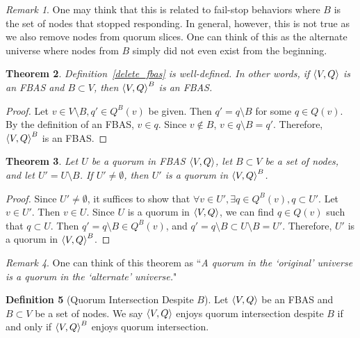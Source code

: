 \documentclass[12pt, psamsfonts]{amsart}
\newtheorem{thm}{Theorem}[subsection]
\theoremstyle{definition}
\newtheorem{defn}[thm]{Definition}
\theoremstyle{remark}
\newtheorem{rem}[thm]{Remark}
\numberwithin{equation}{subsection}
\begin{document}
\begin{rem}
    One may think that this is related to fail-stop behaviors where $B$ is the set of nodes that stopped responding.
    In general, however, this is not true as we also remove nodes from quorum slices.
    One can think of this as the alternate universe where nodes from $B$ simply did not even exist from the beginning.
\end{rem}

\begin{thm}
    Definition~\ref{delete_fbas} is well-defined.
    In other words, if $\ev{V, Q}$ is an FBAS and $B \subset V$, then $\ev{V, Q}^B$ is an FBAS\@.
\end{thm}

\begin{proof}
    Let $v \in V \setminus B, q' \in Q^B(v)$ be given.
    Then $q' = q \setminus B$ for some $q \in Q(v)$.
    By the definition of an FBAS, $v \in q$.
    Since $v \notin B$, $v \in q \setminus B = q'$.
    Therefore, $\ev{V, Q}^B$ is an FBAS\@.
\end{proof}

\begin{thm}\label{quorum_delete_fbas}
    Let $U$ be a quorum in FBAS $\ev{V, Q}$, let $B \subset V$ be a set of nodes, and let $U' = U \setminus B$.
    If $U' \ne \emptyset$, then $U'$ is a quorum in $\ev{V, Q}^B$.
\end{thm}

\begin{proof}
    Since $U' \ne \emptyset$, it suffices to show that $\forall v \in U', \exists q \in Q^B(v), q \subset U'$.
    Let $v \in U'$.
    Then $v \in U$.
    Since $U$ is a quorum in $\ev{V, Q}$, we can find $q \in Q(v)$ such that $q \subset U$.
    Then $q' = q \setminus B \in Q^B(v)$, and $q' = q \setminus B \subset U \setminus B = U'$.
    Therefore, $U'$ is a quorum in $\ev{V, Q}^B$.
\end{proof}

\begin{rem}
    One can think of this theorem as ``\textit{A quorum in the `original' universe is a quorum in the `alternate' universe.}"
\end{rem}

\begin{defn}[Quorum Intersection Despite $B$]
    Let $\ev{V, Q}$ be an FBAS and $B \subset V$ be a set of nodes.
    We say $\ev{V, Q}$ enjoys quorum intersection despite $B$ if and only if $\ev{V, Q}^B$ enjoys quorum intersection.
\end{defn}
\end{document}
